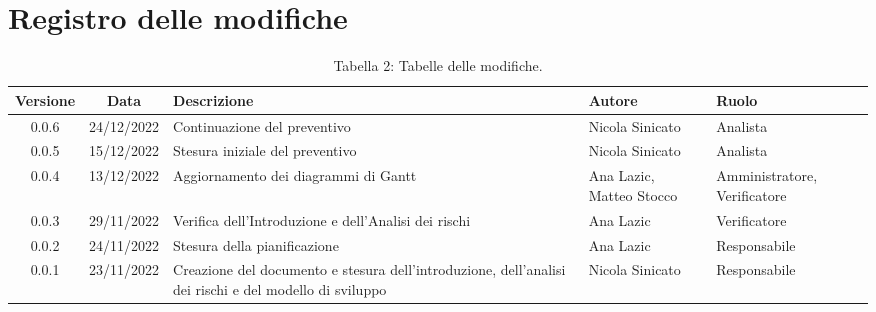 \section*{Registro delle modifiche}
\begin{table}[H]
	\centering
	\renewcommand\tabularxcolumn[1]{>{\Centering}m{#1}}
	\begin{tabularx}{\textwidth}{| c | c | X | X | X |} 
	\hline
	\textbf{Versione} & \textbf{Data} & \textbf{Descrizione} & \textbf{Autore} & \textbf{Ruolo}\\
	\hline
	0.0.6 & 24/12/2022 & Continuazione del preventivo & Nicola Sinicato & Analista\\
	\hline
	0.0.5 & 15/12/2022 & Stesura iniziale del preventivo& Nicola Sinicato & Analista\\
	\hline
	0.0.4 & 13/12/2022 & Aggiornamento dei diagrammi di Gantt & Ana Lazic, Matteo Stocco & Amministratore, Verificatore\\
	\hline
	0.0.3 & 29/11/2022 & Verifica dell'Introduzione e dell'Analisi dei rischi & Ana Lazic & Verificatore\\
	\hline
	0.0.2 & 24/11/2022 & Stesura della pianificazione & Ana Lazic & Responsabile\\
	\hline
	0.0.1 & 23/11/2022 & Creazione del documento e stesura dell'introduzione, dell'analisi dei rischi e del modello di sviluppo & Nicola Sinicato & Responsabile\\
 	\hline
	\end{tabularx}
	\vspace{10pt}
	\caption{Tabella 2: Tabelle delle modifiche.}
\end{table}

